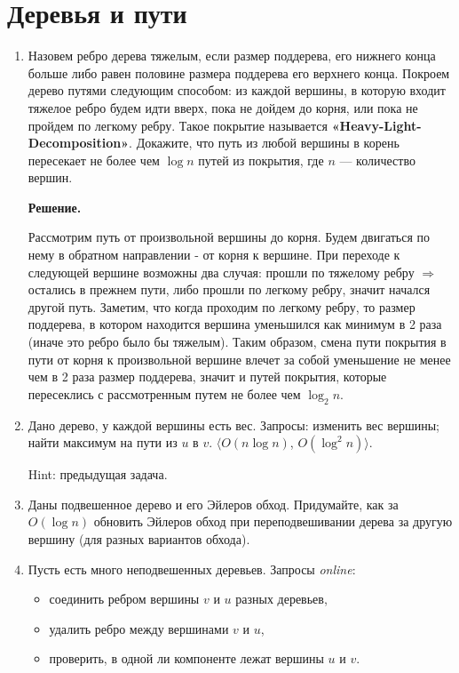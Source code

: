 \section*{Деревья и пути}
\begin{enumerate}
	\item Назовем ребро дерева тяжелым, если размер поддерева, его нижнего конца больше либо равен 
	половине размера поддерева его верхнего конца. Покроем дерево путями следующим способом: из 
	каждой вершины, в которую входит тяжелое ребро будем идти вверх, пока не дойдем до корня, 
	или пока не пройдем по легкому ребру. Такое покрытие называется 
	\textbf{«Heavy-Light-Decomposition»}. Докажите, что путь из любой вершины в корень пересекает 
	не более чем $\log n$ путей из покрытия, где $n$ — количество вершин.
	
	\textbf{Решение.} 
	
	Рассмотрим путь от произвольной вершины до корня. Будем двигаться по нему 
	в обратном направлении - от корня к вершине. При переходе к следующей вершине возможны два 
	случая: прошли по тяжелому ребру $\Rightarrow$ остались в прежнем пути, либо прошли по 
	легкому ребру, значит начался другой путь. Заметим, что когда проходим по легкому ребру, то 
	размер поддерева, в котором находится вершина уменьшился как минимум в 2 раза (иначе это 
	ребро было бы тяжелым). Таким образом, смена пути покрытия в пути от корня к произвольной 
	вершине влечет за собой уменьшение не менее чем в 2 раза размер поддерева, значит и путей 
	покрытия, которые пересеклись с рассмотренным путем не более чем $\log_2 n$.
	
	\item Дано дерево, у каждой вершины есть вес. Запросы: 
	изменить вес вершины; 
	найти максимум на пути из $u$ в $v$. $\langle O(n \log n)$, $O(\log^2 n) \rangle$. 
	
	Hint: предыдущая задача.
	
	\item Даны подвешенное дерево и его Эйлеров обход. Придумайте, как за $O(\log n)$ обновить 
	Эйлеров	обход при переподвешивании дерева за другую вершину (для разных вариантов обхода).
	
	\item Пусть есть много неподвешенных деревьев. Запросы \textit{online}:
	\begin{itemize}
		\item соединить ребром вершины $v$ и $u$ разных деревьев,
		\item удалить ребро между вершинами $v$ и $u$,
		\item проверить, в одной ли компоненте лежат вершины $u$ и $v$.
	\end{itemize}
	

\end{enumerate}
